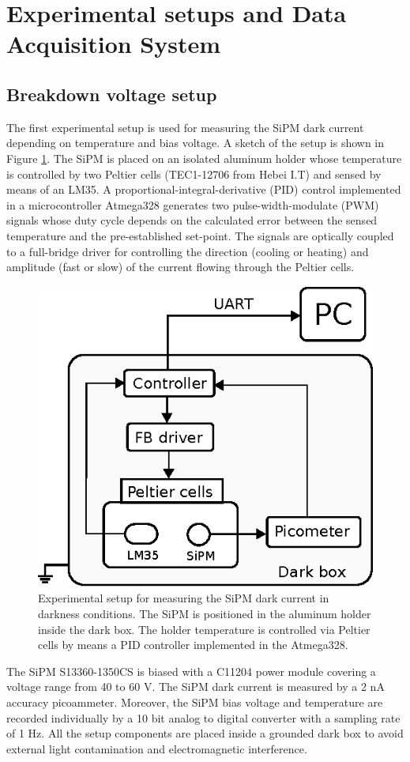 \documentclass[a4paper,11pt]{article}
\begin{document}
\section{Experimental setups and Data Acquisition System}
\label{sec:exp}

\subsection{Breakdown voltage setup}

The first experimental setup is used for measuring the SiPM dark current depending on temperature and bias voltage. A sketch of the setup is shown in Figure \ref{fig:set1}. The SiPM is placed on an isolated aluminum holder whose temperature is controlled by two Peltier cells (TEC1-12706 from Hebei I.T) and sensed by means of an LM35. A proportional-integral-derivative (PID) control implemented in a microcontroller Atmega328 generates two pulse-width-modulate (PWM) signals whose duty cycle depends on the calculated error between the sensed temperature and the pre-established set-point. The signals are optically coupled to a full-bridge driver for controlling the direction (cooling or heating) and amplitude (fast or slow) of the current flowing through the Peltier cells.

\begin{figure}[htbp]
\centering %
\includegraphics[width=.5\textwidth]{Figures/ExpSet1.eps}
\caption{\label{fig:set1} Experimental setup for measuring the SiPM dark current in darkness conditions. The SiPM is positioned in the aluminum holder inside the dark box. The holder temperature is controlled via Peltier cells by means a PID controller implemented in the Atmega328.}
\end{figure}

The SiPM S13360-1350CS is biased with a C11204 power module covering a voltage range from 40 to 60 V. The SiPM dark current is measured by a 2 nA accuracy picoammeter. Moreover, the SiPM bias voltage and temperature are recorded individually by a 10 bit analog to digital converter with a sampling rate of 1 Hz. All the setup components are placed inside a grounded dark box to avoid external light contamination and electromagnetic interference.
\end{document}
